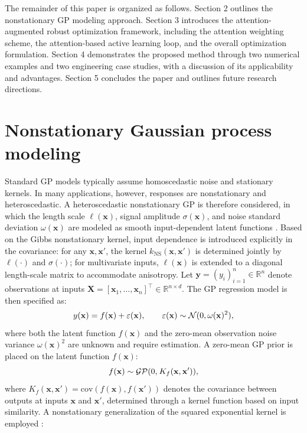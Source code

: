 \documentclass[]{interact}
\theoremstyle{plain}%
\theoremstyle{definition}
\theoremstyle{remark}
\begin{document}
The remainder of this paper is organized as follows. Section 2 outlines the nonstationary GP modeling approach. Section 3 introduces the attention-augmented robust optimization framework, including the attention weighting scheme, the attention-based active learning loop, and the overall optimization formulation. Section 4 demonstrates the proposed method through two numerical examples and two engineering case studies, with a discussion of its applicability and advantages. Section 5 concludes the paper and outlines future research directions.

\section{Nonstationary Gaussian process modeling}

Standard GP models typically assume homoscedastic noise and stationary kernels. In many applications, however, responses are nonstationary and heteroscedastic. A heteroscedastic nonstationary GP is therefore considered, in which the length scale $\ell(\mathbf{x})$, signal amplitude $\sigma(\mathbf{x})$, and noise standard deviation $\omega(\mathbf{x})$ are modeled as smooth input-dependent latent functions \citep{Heinonen2016, Rhode2020}. Based on the Gibbs nonstationary kernel, input dependence is introduced explicitly in the covariance: for any $\mathbf{x}, \mathbf{x}'$, the kernel $k_{\mathrm{NS}}(\mathbf{x},\mathbf{x}')$ is determined jointly by $\ell(\cdot)$ and $\sigma(\cdot)$; for multivariate inputs, $\ell(\mathbf{x})$ is extended to a diagonal length-scale matrix to accommodate anisotropy. Let $\mathbf{y} = (y_i)_{i=1}^n \in \mathbb{R}^n$ denote observations at inputs $\mathbf{X} = [\mathbf{x}_1, \ldots, \mathbf{x}_n]^\top \in \mathbb{R}^{n\times d}$. The GP regression model is then specified as:
\begin{equation}
	y({\bf{x}}) = f({\bf{x}}) + \varepsilon ({\bf{x}}),\qquad \varepsilon ({\bf{x}})\sim{\cal N}(0,\omega {({\bf{x}})^2}),
\end{equation}
where both the latent function $f(\mathbf{x})$ and the zero-mean observation noise variance $\omega(\mathbf{x})^{2}$ are unknown and require estimation. A zero-mean GP prior is placed on the latent function $f(\mathbf{x})$:
\begin{equation}
	f({\bf{x}})\sim{\cal G}{\cal P}(0,{\mkern 1mu} {K_f}({\bf{x}},{\bf{x'}})),
\end{equation}
where $K_{f}(\mathbf{x},\mathbf{x}') = \mathrm{cov}(f(\mathbf{x}), f(\mathbf{x}'))$ denotes the covariance between outputs at inputs $\mathbf{x}$ and $\mathbf{x}'$, determined through a kernel function based on input similarity. A nonstationary generalization of the squared exponential kernel is employed \citep{Heinonen2016}:
\end{document}
